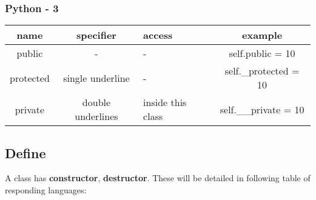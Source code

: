 \documentclass[12pt, a4pape]{article}
\begin{document}
		\subsubsection{Python - 3}
		\begin{table}[H]
		\centering
		\begin{tabular}{|c|c|l|c|}
		\toprule
		name & specifier & access & example \\
		\hline
		public & - & - & self.public = 10  \\
		\hline
		protected & single underline & - & self.\_protected = 10 \\
		\hline
		private & double underlines & inside this class & self.\_\_private = 10\\
		\bottomrule
		\end{tabular}
		\end{table}
		

	\subsection{Define}
		A class has \textbf{constructor}, \textbf{destructor}. These will be detailed in following table of responding languages:
\end{document}

